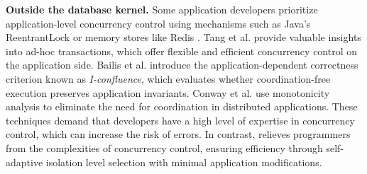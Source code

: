 \noindent\textbf{Outside the database kernel.} 
Some application developers prioritize application-level concurrency control using mechanisms such as Java's ReentrantLock or memory stores like Redis \cite{Redis}. Tang et al. \cite{DBLP:journals/tods/WangTZYZGC24, DBLP:conf/sigmod/TangWZYZG022, DBLP:journals/sigmod/TangWZYZG023} provide valuable insights into ad-hoc transactions, which offer flexible and efficient concurrency control on the application side. Bailis et al. \cite{DBLP:journals/pvldb/BailisFFGHS14} introduce the application-dependent correctness criterion known as \textit{I-confluence}, which evaluates whether coordination-free execution preserves application invariants. Conway et al. \cite{DBLP:conf/cloud/ConwayMAHM12} use monotonicity analysis to eliminate the need for coordination in distributed applications.
These techniques demand that developers have a high level of expertise in concurrency control, which can increase the risk of errors. In contrast, \sysname relieves programmers from the complexities of concurrency control, ensuring efficiency through self-adaptive isolation level selection with minimal application modifications.


